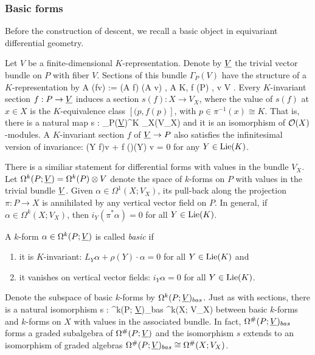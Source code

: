 \subsubsection{Basic forms}

Before the construction of descent, we recall a basic object in equivariant differential geometry.

Let $V$ be a finite-dimensional $K$-representation. 
Denote by $\underline{V}$ the trivial vector bundle on $P$ with fiber $V$. 
Sections of this bundle $\Gamma_P(V)$ have the structure of a $K$-representation by
\ben
A \cdot (f\tensor v) := (A \cdot f) \tensor (A \cdot v) \;\; , \;\; A \in K, \; f \in \cO(P)\; , v \in V .
\een
Every $K$-invariant section $f : P \to \underline{V}$ induces a section $s(f): X \to V_X$,
where the value of $s(f)$ at $x \in X$ is the $K$-equivalence class $[(p,f(p)]$, with $p \in \pi^{-1}(x) \cong K$.
That is, there is a natural map 
\ben
s : \Gamma_P(\ul{V})^K \to \Gamma_X(V_X) 
\een
and it is an isomorphism of $\mathcal O(X)$-modules. A $K$-invariant section $f$ of $\underline{V} \to P$ also satisfies the infinitesimal version of invariance: 
\ben
(Y \cdot f)\tensor v + f (\rho)(Y) \cdot v = 0 
\een
for any $Y \in {\rm Lie}(K)$.

There is a similiar statement for differential forms with values in the bundle $V_X$. Let $\Omega^k(P ; \underline{V}) = \Omega^k(P) \otimes V$ denote the space of $k$-forms on $P$ with values in the trivial bundle $\underline{V}$. Given $\alpha \in \Omega^1(X ; V_X)$, its pull-back along the projection $\pi: P \to X$ is annihilated by any vertical vector field on $P$. In general, if $\alpha \in \Omega^k(X; V_X)$, then $i_Y(\pi^*\alpha) = 0$ for all $Y \in {\rm Lie}(K)$.

\begin{dfn} A $k$-form $\alpha \in \Omega^k(P; \underline{V})$ is called {\em basic} if 
\begin{enumerate}
\item it is $K$-invariant: $L_Y \alpha + \rho(Y) \cdot \alpha = 0 $ for all $Y \in {\rm Lie}(K)$ and
\item  it vanishes on vertical vector fields: $i_Y \alpha = 0$ for all $Y \in {\rm Lie}(K)$. 
\end{enumerate}
\end{dfn}

Denote the subspace of basic $k$-forms by $\Omega^k(P; \underline{V})_{bas}$. Just as with sections, there is a natural isomorphism
\ben
s : \Omega^k(P; \ul{V})_{bas} \xto{\cong} \Omega^k(X; V_X) 
\een
between basic $k$-forms and $k$-forms on $X$ with values in the associated bundle.
In fact, $\Omega^{\#}(P; \underline{V})_{bas}$ forms a graded subalgebra of $\Omega^{\#}(P; \underline{V})$ and the isomorphism $s$ extends to an isomorphism of graded algebras $\Omega^{\#}(P; \underline{V})_{bas} \cong \Omega^{\#}(X; V_X)$.

